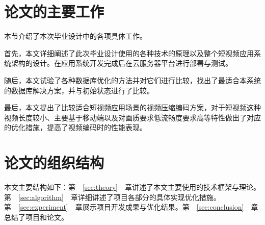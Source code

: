 \section{论文的主要工作}

本节介绍了本次毕业设计中的各项具体工作。

首先，本文详细阐述了此次毕业设计使用的各种技术的原理以及整个短视频应用系统架构的设计。在应用系统开发完成后在云服务器平台进行部署与测试。

随后，本文试验了各种数据库优化的方法并对它们进行比较，找出了最适合本系统的数据库解决方案，并与初始状态进行了比较。

最后，本文提出了比较适合短视频应用场景的视频压缩编码方案，对于短视频这种视频长度较小、主要基于移动端以及对画质要求低流畅度要求高等特性做出了对应的优化措施，提高了视频编码时的性能表现。




\section{论文的组织结构}

本文主要结构如下：第~~\ref{sec:theory}~~章讲述了本文主要使用的技术框架与理论。第~~\ref{sec:algorithm}~~章详细讲述了项目各部分的具体实现优化措施。第~~\ref{sec:experiment}~~章展示项目开发成果与优化结果。第~~\ref{sec:conclusion}~~章总结了项目和论文。


